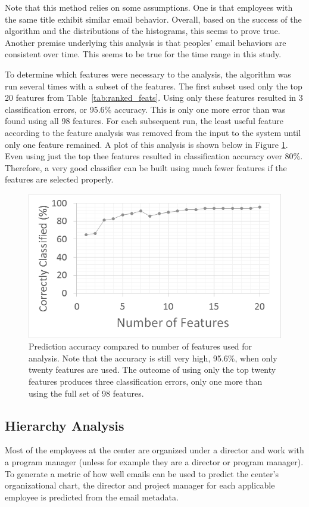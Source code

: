 \documentclass[10pt,twocolumn,conference]{IEEEtran}
\begin{document}
Note that this method relies on some assumptions.  One is that employees with the same title exhibit similar email behavior.  Overall, based on the success of the algorithm and the distributions of the histograms, this seems to prove true.  Another premise underlying this analysis is that peoples' email behaviors are consistent over time.  This seems to be true for the time range in this study.

To determine which features were necessary to the analysis, the algorithm was run several times with a subset of the features.  The first subset used only the top 20 features from Table~\ref{tab:ranked_feats}.  Using only these features resulted in 3 classification errors, or 95.6\% accuracy.  This is only one more error than was found using all 98 features.  For each subsequent run, the least useful feature according to the feature analysis was removed from the input to the system until only one feature remained.  A plot of this analysis is shown below in Figure \ref{fig:feat_analysis}.  Even using just the top thee features resulted in classification accuracy over 80\%.  Therefore, a very good classifier can be built using much fewer features if the features are selected properly.
\begin{figure}[t]
    \centering
        \includegraphics[width=.9\columnwidth,trim={1mm 6mm 1mm 3.5mm},clip]{FeatureAnalysis}
        \vspace{-7pt}
        \caption{Prediction accuracy compared to number of features used for analysis.  Note that the accuracy is still very high, 95.6\%, when only twenty features are used.  The outcome of using only the top twenty features produces three classification errors, only one more than using the full set of 98 features. }
        \label{fig:feat_analysis}
\end{figure}

\subsection{Hierarchy Analysis}
Most of the employees at the center are organized under a director and work with a program manager (unless for example they are a director or program manager).  To generate a metric of how well emails can be used to predict the center's organizational chart, the director and project manager for each applicable employee is predicted from the email metadata. 
\end{document}
